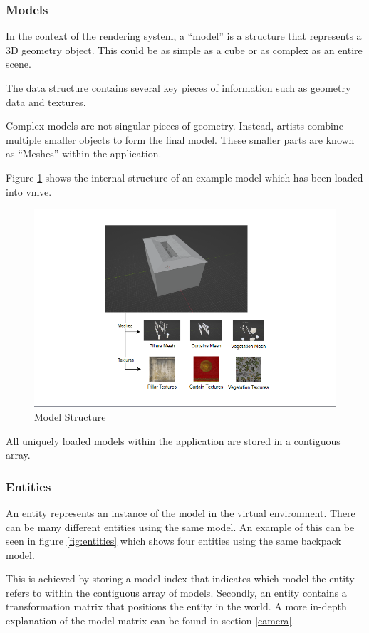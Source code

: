 \documentclass[11pt]{article}
\begin{document}
\subsubsection{Models}
In the context of the rendering system, a ``model'' is a structure that
represents a 3D geometry object. This could be as simple as a cube or as complex
as an entire scene.

The data structure contains several key pieces of information such as geometry
data and textures. 

Complex models are not singular pieces of geometry. Instead, artists combine
multiple smaller objects to form the final model. These smaller parts are known
as ``Meshes'' within the application.

Figure \ref{fig:model} shows the internal structure of an example model which
has been loaded into \gls*{vmve}.
\begin{figure}[H]
  \centering
  \includegraphics[width=\textwidth]{images/model.png}
  \caption{Model Structure}
  \label{fig:model}
\end{figure}

All uniquely loaded models within the application are stored in a contiguous
array. 

\subsubsection{Entities}
An entity represents an instance of the model in the virtual environment. There
can be many different entities using the same model. An example of this can be
seen in figure \ref{fig:entities} which shows four entities using the same
backpack model.

This is achieved by storing a model index that indicates which model the entity
refers to within the contiguous array of models. Secondly, an entity contains a
transformation matrix that positions the entity in the world. A more in-depth
explanation of the model matrix can be found in section \ref{camera}.
\end{document}
